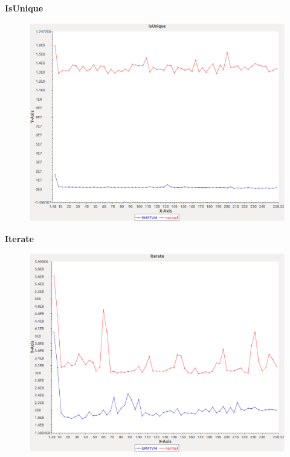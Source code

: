 \noindent\textbf{IsUnique}

\begin{figure}[h]
\centering
\includegraphics[width=\textwidth]{../graphs/sequence/isUnique}
\end{figure}
\pagebreak

\noindent\textbf{Iterate}

\begin{figure}[h]
\centering
\includegraphics[width=\textwidth]{../graphs/sequence/Iterate}
\end{figure}
\pagebreak

